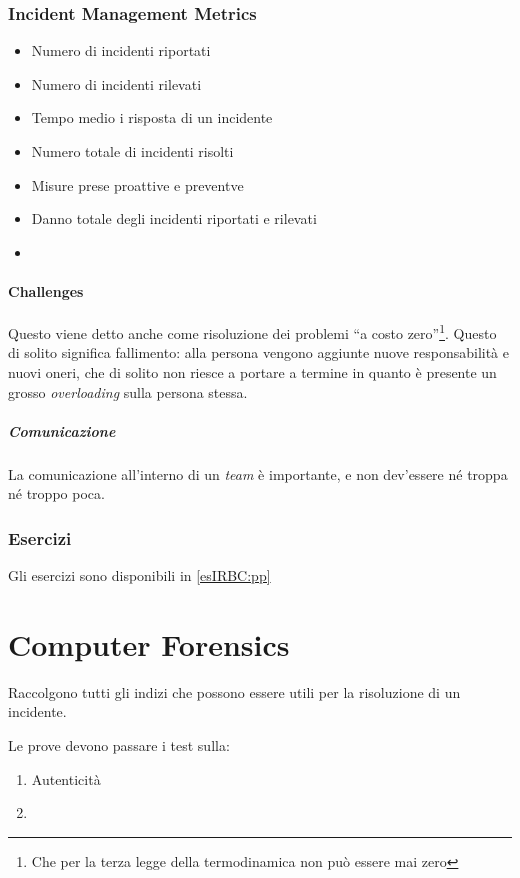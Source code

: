 \subsection{Incident Management Metrics}
\begin{itemize}
\item Numero di incidenti riportati
\item Numero di incidenti rilevati
\item Tempo medio i risposta di un incidente
\item Numero totale di incidenti risolti
\item Misure prese proattive e preventve
\item Danno totale degli incidenti riportati e rilevati
\item {}
\end{itemize}

\subsubsection{Challenges} %

Questo viene detto anche come risoluzione dei problemi ``a costo
zero''\footnote{Che per la terza legge della termodinamica non può essere mai
zero}. Questo di solito significa fallimento: alla persona vengono aggiunte
nuove responsabilità e nuovi oneri, che di solito non riesce a portare a termine
in quanto è presente un grosso \textit{overloading} sulla persona stessa.

\paragraph*{Comunicazione} La comunicazione all'interno di un \textit{team} è
importante, e non dev'essere né troppa né troppo poca.

\subsection{Esercizi}

Gli esercizi sono disponibili in \ref{esIRBC:pp}

\chapter{Computer Forensics}

Raccolgono tutti gli indizi che possono essere utili per la risoluzione di un
incidente.

Le prove devono passare i test sulla:
\begin{enumerate}
\item Autenticità
\item {}
\end{enumerate}

